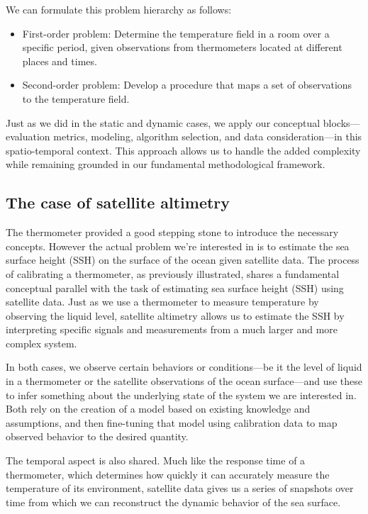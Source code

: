 \begin{bibunit}
We can formulate this problem hierarchy as follows:

\begin{itemize}
    \item First-order problem: Determine the temperature field in a room over a specific period, given observations from thermometers located at different places and times.
    \item Second-order problem: Develop a procedure that maps a set of observations to the temperature field.
\end{itemize}
    
    

Just as we did in the static and dynamic cases, we apply our conceptual blocks—evaluation metrics, modeling, algorithm selection, and data consideration—in this spatio-temporal context. This approach allows us to handle the added complexity while remaining grounded in our fundamental methodological framework.

\subsection{The case of satellite altimetry}
  The thermometer provided a good stepping stone to introduce the necessary concepts.
  However the actual problem we're interested in is to estimate the sea surface height (SSH) on the surface of the ocean given satellite data.
The process of calibrating a thermometer, as previously illustrated, shares a fundamental conceptual parallel with the task of estimating sea surface height (SSH) using satellite data. Just as we use a thermometer to measure temperature by observing the liquid level, satellite altimetry allows us to estimate the SSH by interpreting specific signals and measurements from a much larger and more complex system.

In both cases, we observe certain behaviors or conditions—be it the level of liquid in a thermometer or the satellite observations of the ocean surface—and use these to infer something about the underlying state of the system we are interested in. Both rely on the creation of a model based on existing knowledge and assumptions, and then fine-tuning that model using calibration data to map observed behavior to the desired quantity.

The temporal aspect is also shared. Much like the response time of a thermometer, which determines how quickly it can accurately measure the temperature of its environment, satellite data gives us a series of snapshots over time from which we can reconstruct the dynamic behavior of the sea surface.


\end{bibunit}

